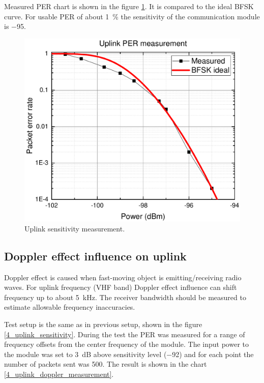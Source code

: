 Measured PER chart is shown in the figure \ref{4_uplink_sensitivity_graph}. It is compared to the ideal BFSK curve. For usable PER of about \SI{1}{\percent} the sensitivity of the communication module is \SI{-95}{\dBm}.

\begin{figure}
    \centering
    \includegraphics[width=0.8\paperwidth]{img/6/uplink_per.pdf}
    \caption{Uplink sensitivity measurement.}
    \label{4_uplink_sensitivity_graph}
\end{figure}


\subsection{Doppler effect influence on uplink}
Doppler effect is caused when fast-moving object is emitting/receiving radio waves. For uplink frequency (VHF band) Doppler effect influence can shift frequency up to about \SI{5}{\kHz}. The receiver bandwidth should be measured to estimate allowable frequency inaccuracies.

Test setup is the same as in previous setup, shown in the figure \ref{4_uplink_sensitivity}. During the test the PER was measured for a range of frequency offsets from the center frequency of the module. The input power to the module was set to \SI{3}{\dB} above sensitivity level (\SI{-92}{\dBm}) and for each point the number of packets sent was \si{500}.  The result is shown in the chart \ref{4_uplink_doppler_measurement}.

